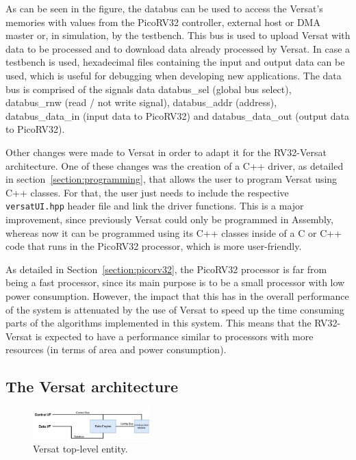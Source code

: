 \documentclass[conference]{IEEEtran}
\begin{document}
As can be seen in the figure, the databus can be used to access the Versat's
memories with values from the PicoRV32 controller, external host or \ac{DMA}
master or, in simulation, by the testbench. This bus is used to upload
Versat with data to be processed and to download data already processed by
Versat. In case a testbench is used, hexadecimal files containing the input and
output data can be used, which is useful for debugging when developing new
applications. The data bus is comprised of the signals data databus\_sel (global
bus select), databus\_rnw (read / not write signal), databus\_addr (address),
databus\_data\_in (input data to PicoRV32) and databus\_data\_out (output data to
PicoRV32).

Other changes were made to Versat in order to adapt it for the RV32-Versat
architecture. One of these changes was the creation of a C++ driver, as detailed
in section~\ref{section:programming}, that allows the user to program Versat
using C++ classes. For that, the user just needs to include the respective {\tt
	versatUI.hpp} header file and link the driver functions. This is a major
improvement, since previously Versat could only be programmed in Assembly,
whereas now it can be programmed using its C++ classes inside of a C or C++ code
that runs in the PicoRV32 processor, which is more user-friendly.

As detailed in Section~\ref{section:picorv32}, the PicoRV32 processor is far
from being a fast processor, since its main purpose is to be a small processor
with low power consumption. However, the impact that this has in the overall
performance of the system is attenuated by the use of Versat to speed up the
time consuming parts of the algorithms implemented in this system. This means
that the RV32-Versat is expected to have a performance similar to processors
with more resources (in terms of area and power consumption).


\subsection{The Versat architecture}
\label{section:versat}

\begin{figure}[!htb]
	\centering
	\includegraphics[width=0.4\textwidth]{Figures/top.pdf}
	\caption{Versat top-level entity.}
	\label{fig:top}
\end{figure}
\end{document}
